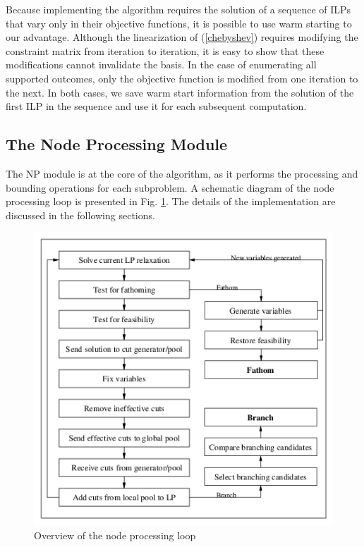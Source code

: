 Because implementing the algorithm requires the solution of a sequence of
ILPs that vary only in their objective functions, it is possible to use warm
starting to our advantage.  Although the linearization of (\ref{chebyshev})
requires modifying the constraint matrix from iteration to iteration, it is
easy to show that these modifications cannot invalidate the basis. In the case
of enumerating all supported outcomes, only the objective function is modified
from one iteration to the next. In both cases, we save warm start information
from the solution of the first ILP in the sequence and use it for each
subsequent computation.

\subsection{The Node Processing Module}

The NP module is at the core of the algorithm, as it performs the
processing and bounding operations for each subproblem. A schematic
diagram of the node processing loop is presented in Fig. \ref{LP-loop}.
The details of the implementation are discussed in the following
sections. 

\begin{figure}
\centering
\includegraphics[width=4.8in]{lploop}
\caption{Overview of the node processing loop}
\label{LP-loop}
\end{figure}

